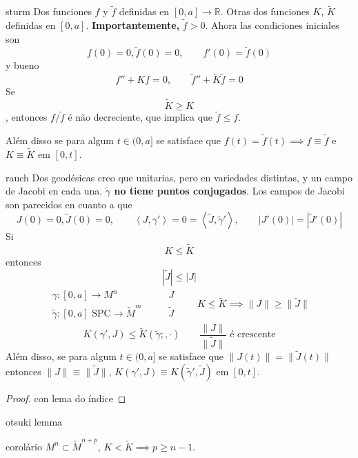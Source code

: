 \begin{thing6}{sturm}\leavevmode
	Dos funciones \(f\) y \(\tilde{f}\) definidas en \([0,a] \to \mathbb{R}\).
	Otras dos funciones \(K\), \(\tilde{K}\) definidas en \([0,a]\). \textbf{Importantemente,} \(\tilde{f}>0\). Ahora las condiciones iniciales son
	\[f(0)=0, \tilde{f}(0)=0, \qquad f'(0)=\tilde{f}(0)\]
y bueno
\[f''+Kf=0, \qquad  \tilde{f}''+\tilde{K}\tilde{f}=0\]
Se \[\tilde{K} \geq K\], entonces \(f/\tilde{f}\) é não decreciente, que implica que \(\tilde{f} \leq  f\).

Além disso se para algum \(t \in (0,a]\) se satisface que \(f(t)=\tilde{f}(t) \implies  f\equiv\tilde{f}\) e \(K\equiv\tilde{K}\) em \([0,t]\).
\end{thing6}

\begin{thing6}{rauch}\leavevmode
	Dos geodésicas creo que unitarias, pero en variedades distintas, y un campo de Jacobi en cada una. \textbf{\(\tilde{\gamma}\) no tiene puntos conjugados}. Los campos de Jacobi son parecidos en cuanto a que
	\[J(0)=0, \tilde{J}(0)=0, \qquad \left<J,\gamma'\right>=0=\left<\tilde{J},\tilde{\gamma}'\right>,\qquad |J'(0)|=|\tilde{J}'(0)|\]
Si
\[K\leq \tilde{K}\]
entonces
\[|\tilde{J}|\leq |J|\]
 \begin{align*}
\begin{aligned}
	\gamma:[0,a] \longrightarrow M^n \qquad &J\\
	\tilde{\gamma}:[0,a] \text{ SPC} \longrightarrow \tilde{M}^m \qquad &\tilde{J}
\end{aligned}\qquad K \leq \tilde{K} \implies \|J\| \geq \|\tilde{J}\|
\end{align*}
\[K(\gamma',J) \leq \tilde{K}(\tilde{\gamma};,\cdot)\qquad \frac{\|J\|}{\|\tilde{J}\|}\text{ é crescente} \]
Além disso, se para algum \(t \in (0,a]\) se satisface que \(\|J(t)\|=\|\tilde{J}(t)\|\) entonces \(\|J\|\equiv\|\tilde{J}\|\), \(K(\gamma',J)\equiv K(\tilde{\gamma}',\tilde{J})\) em \([0,t]\).
\end{thing6}
\begin{proof}\leavevmode
con lema do índice
\end{proof}

\begin{thing6}{otsuki lemma}\leavevmode
\end{thing6}

\begin{thing6}{corolário}\leavevmode
\(M^n \subset \tilde{M}^{n+p}\), \(K < \tilde{K} \implies p \geq n-1\).
\end{thing6}

